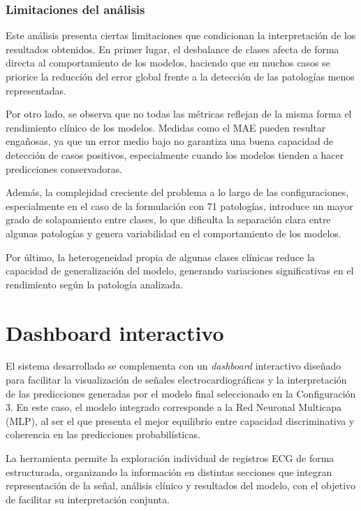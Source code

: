 \documentclass[12pt,a4paper,twoside]{book}
\begin{document}
\subsection{Limitaciones del análisis}

Este análisis presenta ciertas limitaciones que condicionan la interpretación de los resultados obtenidos.
En primer lugar, el desbalance de clases afecta de forma directa al comportamiento de los modelos, haciendo que en muchos casos se priorice la reducción del error global frente a la detección de las patologías menos representadas.

Por otro lado, se observa que no todas las métricas reflejan de la misma forma el rendimiento clínico de los modelos.
Medidas como el MAE pueden resultar engañosas, ya que un error medio bajo no garantiza una buena capacidad de detección de casos positivos, especialmente cuando los modelos tienden a hacer predicciones conservadoras.

Además, la complejidad creciente del problema a lo largo de las configuraciones, especialmente en el caso de la formulación con 71 patologías, introduce un mayor grado de solapamiento entre clases, lo que dificulta la separación clara entre algunas patologías y genera variabilidad en el comportamiento de los modelos.

Por último, la heterogeneidad propia de algunas clases clínicas reduce la capacidad de generalización del modelo, generando variaciones significativas en el rendimiento según la patología analizada.

\chapter{Dashboard interactivo}

El sistema desarrollado se complementa con un \textit{dashboard} interactivo diseñado para facilitar la visualización de señales electrocardiográficas y la interpretación de las predicciones generadas por el modelo final seleccionado en la Configuración 3. 
En este caso, el modelo integrado corresponde a la Red Neuronal Multicapa (MLP), al ser el que presenta el mejor equilibrio entre capacidad discriminativa y coherencia en las predicciones probabilísticas.

La herramienta permite la exploración individual de registros ECG de forma estructurada, organizando la información en distintas secciones que integran representación de la señal, análisis clínico y resultados del modelo, con el objetivo de facilitar su interpretación conjunta.
\end{document}
